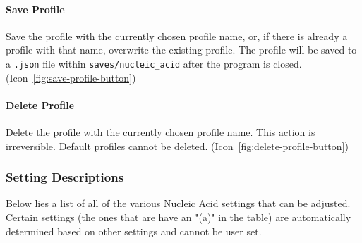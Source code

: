 \documentclass[titlepage]{article}
\begin{document}
\paragraph{Save Profile}
Save the profile with the currently chosen profile name, or, if there is already a profile with that name, overwrite the existing profile. The profile will be saved to a \texttt{.json} file within \texttt{saves/nucleic\_acid} after the program is closed. (Icon~\ref{fig:save-profile-button})

\paragraph{Delete Profile}
Delete the profile with the currently chosen profile name. This action is irreversible. Default profiles cannot be deleted. (Icon~\ref{fig:delete-profile-button})

\subsubsection{Setting Descriptions}
Below lies a list of all of the various Nucleic Acid settings that can be adjusted. Certain settings (the ones that are have an "(a)" in the table) are automatically determined based on other settings and cannot be user set. \linebreak
\end{document}
